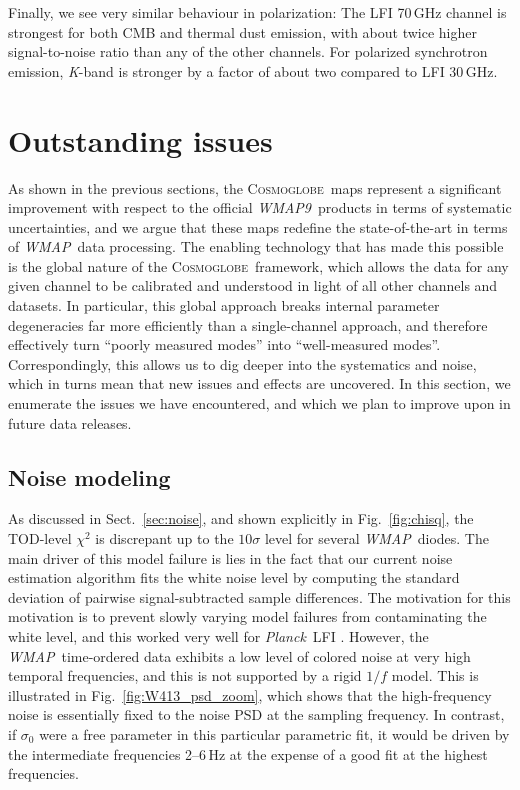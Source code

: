 \documentclass[twocolumn]{../../common/aa}
\def\WMAP{\emph{WMAP}}
\def\WMAPnine{\emph{WMAP9}}
\def\Planck{\emph{Planck}}
\newcommand{\cosmoglobe}{\textsc{Cosmoglobe}}
\newcommand{\K}[0]{\textit K}
\begin{document}
Finally, we see very similar behaviour in polarization: The LFI 70\,GHz channel is strongest for both CMB and thermal dust emission, with about twice higher signal-to-noise ratio than any of the other channels. For polarized synchrotron emission, \K-band is stronger by a factor of about two compared to LFI 30\,GHz.

















\section{Outstanding issues}
\label{sec:issues}

As shown in the previous sections, the \cosmoglobe\ maps represent a significant improvement with respect to the official \WMAPnine\ products in terms of systematic uncertainties, and we argue that these maps redefine the state-of-the-art in terms of \WMAP\ data processing. The enabling technology that has made this possible is the global nature of the \cosmoglobe\ framework, which allows the data for any given channel to be calibrated and understood in light of all other channels and datasets. In particular, this global approach breaks internal parameter degeneracies far more efficiently than a single-channel approach, and therefore effectively turn ``poorly measured modes'' into ``well-measured modes''. Correspondingly, this allows us to dig deeper into the systematics and noise, which in turns mean that new issues and effects are uncovered. In this section, we enumerate the issues we have encountered, and which we plan to improve upon in future data releases.

\subsection{Noise modeling}
\label{sec:noisemodel}

As discussed in Sect.~\ref{sec:noise}, and shown explicitly in Fig.~\ref{fig:chisq}, the TOD-level $\chi^2$ is discrepant up to the $10\sigma$ level for several \WMAP\ diodes. The main driver of this model failure is lies in the fact that our current noise estimation algorithm fits the white noise level by computing the standard deviation of pairwise signal-subtracted sample differences. The motivation for this motivation is to prevent slowly varying model failures from contaminating the white level, and this worked very well for \Planck\ LFI \citep{bp06}. However, the \WMAP\ time-ordered data exhibits a low level of colored noise at very high temporal frequencies, and this is not supported by a rigid $1/f$ model. This is illustrated in Fig.~\ref{fig:W413_psd_zoom}, which shows that the high-frequency noise is essentially fixed to the noise PSD at the sampling frequency. In contrast, if $\sigma_0$ were a free parameter in this particular parametric fit, it would be driven by the intermediate frequencies 2--6\,Hz at the expense of a good fit at the highest frequencies.
\end{document}
